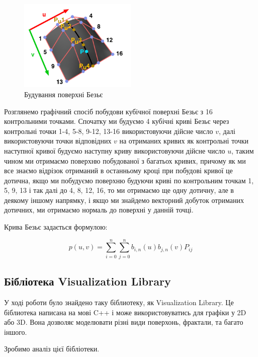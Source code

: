 \documentclass[14pt,a4paper]{extarticle}
\theoremstyle{definition}
\renewcommand{\[}{\begin{singlespace}\begin{equation*}}
\renewcommand{\]}{\end{equation*}\end{singlespace}}
\begin{document}
\begin{figure}[!htb]
    \centering
    \includegraphics[width=0.5\textwidth]{bezier-surface.png}
    \caption{Будування поверхні Безьє}\label{fig:bezier-surface}
\end{figure}

Розглянемо графічний спосіб побудови кубічної поверхні Безьє з 16 контрольними точками. Спочатку ми будуємо 4 кубічні криві Безьє через контрольні точки 1-4, 5-8, 9-12, 13-16 використовуючи дійсне число $v$, далі використовуючи точки відповідних $v$ на отриманих кривих як контрольні точки наступної кривої будуємо наступну криву використовуючи дійсне число $u$, таким чином ми отримаємо поверхню побудованої з багатьох кривих, причому як ми все знаємо відрізок отриманий в останньому кроці при побудові кривої це дотична, якщо ми побудуємо поверхню будуючи криві по контрольним точкам 1, 5, 9, 13 і так далі до 4, 8, 12, 16, то ми отримаємо ще одну дотичну, але в деякому іншому напрямку, і якщо ми знайдемо векторний добуток отриманих дотичних, ми отримаємо нормаль до поверхні у данній точці.

Крива Безьє задається формулою:
\[p(u,v)=\sum_{i=0}^n\sum_{j=0}^n b_{i,n}(u) b_{j,n}(v) P_{ij}\]

\subsection{Бібліотека Visualization Library}

У ході роботи було знайдено таку біблиотеку, як Visualization Library. Це біблиотека написана на мові C++ і може використовуватись для графіки у 2D або 3D. Вона дозволяє моделювати різні види поверхонь, фрактали, та багато іншого.

Зробимо аналіз цієї бібліотеки.
\end{document}
